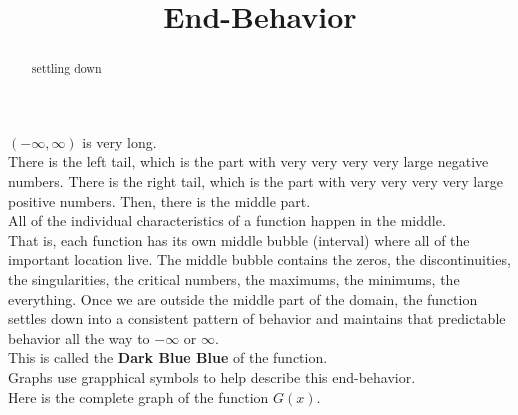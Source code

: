 \documentclass{ximera}
\title{End-Behavior}
\begin{document}
\begin{abstract}
settling down
\end{abstract}
\maketitle


$(-\infty, \infty)$ is very long. \\



There is the left tail, which is the part with very very very very large negative numbers. There is the right tail, which is the part with very very very very large positive numbers. Then, there is the middle part. \\

All of the individual characteristics of a function happen in the middle. \\

That is, each function has its own middle bubble (interval) where all of the important location live.  The middle bubble contains the zeros, the discontinuities, the singularities, the critical numbers, the maximums, the minimums, the everything.  Once we are outside the middle part of the domain, the function settles down into a consistent pattern of behavior and maintains that predictable behavior all the way to $-\infty$ or $\infty$. \\

This is called the \textbf{\textcolor{blue!55!black}{Dark Blue Blue}} of the function. \\


Graphs use grapphical symbols to help describe this end-behavior.\\


Here is the complete graph of the function $G(x)$. \\
\end{document}
